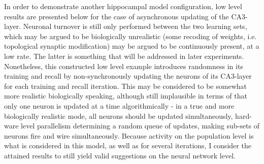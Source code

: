 
In order to demonstrate another hippocampal model configuration, low level results are presented below for the case of asynchronous updating of the CA3-layer. Neuronal turnover is still only performed between the two learning sets, which may be argued to be biologically unrealistic (some recoding of weights, i.e. topological synaptic modification) may be argued to be continuously present, at a low rate. The latter is something that will be addressed in later experiments. Nonetheless, this constructed low level example introduces randomness in its training and recall by non-synchronously updating the neurons of its CA3-layer for each training and recall iteration. This may be considered to be somewhat more realistic biologically speaking, although still implausible in terms of that only one neuron is updated at a time algorithmically - in a true and more biologically realistic mode, all neurons should be updated simultaneously, hard-ware level parallelism determining a random queue of updates, making sub-sets of neurons fire and wire simultaneously. Because activity on the population level is what is considered in this model, as well as for several iterations, I consider the attained results to still yield valid suggestions on the neural network level.

